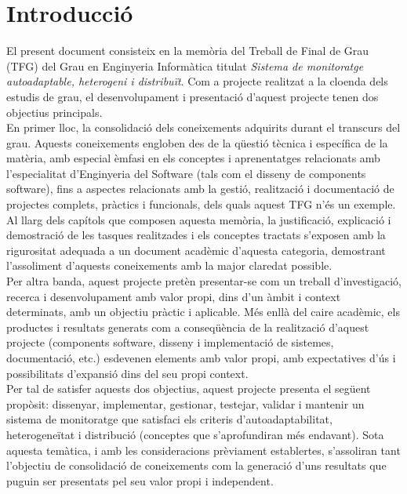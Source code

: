 
\chapter{Introducció} %

\label{Introduccio} %

El present document consisteix en la memòria del Treball de Final de Grau (TFG) del Grau en Enginyeria Informàtica titulat \textit{Sistema de monitoratge autoadaptable, heterogeni i distribuït}. Com a projecte realitzat a la cloenda dels estudis de grau, el desenvolupament i presentació d'aquest projecte tenen dos objectius principals.\\

En primer lloc, la consolidació dels coneixements adquirits durant el transcurs del grau. Aquests coneixements engloben des de la qüestió tècnica i específica de la matèria, amb especial èmfasi en els conceptes i aprenentatges relacionats amb l'especialitat d'Enginyeria del Software (tals com el disseny de components software), fins a aspectes relacionats amb la gestió, realització i documentació de projectes complets, pràctics i funcionals, dels quals aquest TFG n'és un exemple. Al llarg dels capítols que composen aquesta memòria, la justificació, explicació i demostració de les tasques realitzades i els conceptes tractats s'exposen amb la rigurositat adequada a un document acadèmic d'aquesta categoria, demostrant l'assoliment d'aquests coneixements amb la major claredat possible.\\

Per altra banda, aquest projecte pretèn presentar-se com un treball d'investigació, recerca i desenvolupament amb valor propi, dins d'un àmbit i context determinats, amb un objectiu pràctic i aplicable. Més enllà del caire acadèmic, els productes i resultats generats com a conseqüència de la realització d'aquest projecte (components software, disseny i implementació de sistemes, documentació, etc.) esdevenen elements amb valor propi, amb expectatives d'ús  i possibilitats d'expansió dins del seu propi context.\\

Per tal de satisfer aquests dos objectius, aquest projecte presenta el següent propòsit: dissenyar, implementar, gestionar, testejar, validar i mantenir un sistema de monitoratge que satisfaci els criteris d'autoadaptabilitat, heterogeneïtat i distribució (conceptes que s'aprofundiran més endavant). Sota aquesta temàtica, i amb les consideracions prèviament establertes, s'assoliran tant l'objectiu de consolidació de coneixements com la generació d'uns resultats que puguin ser presentats pel seu valor propi i independent.